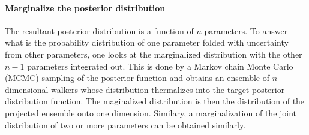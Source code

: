 \paragraph{Marginalize the posterior distribution} The resultant posterior distribution is a function of $n$ parameters.
To answer what is the probability distribution of one parameter folded with uncertainty from other parameters, one looks at the marginalized distribution with the other $n-1$ parameters integrated out.
This is done by a Markov chain Monte Carlo (MCMC) sampling of the posterior function and obtains an ensemble of $n$-dimensional walkers whose distribution thermalizes into the target posterior distribution function.
The maginalized distribution is then the distribution of the projected ensemble onto one dimension.
Similary, a marginalization of the joint distribution of two or more parameters can be obtained similarly.



